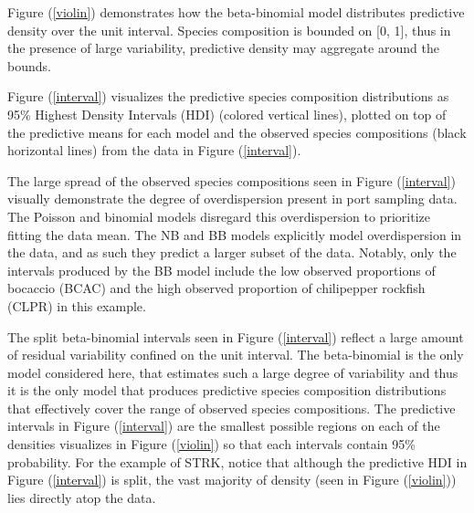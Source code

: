 \documentclass[12pt]{article}
\begin{document}
Figure (\ref{violin}) demonstrates how the beta-binomial model distributes 
predictive density over the unit interval. Species composition is bounded on 
{[}0, 1{]}, thus in the presence of large variability, predictive density may 
aggregate around the bounds.

Figure (\ref{interval}) visualizes the predictive species composition
distributions as 95\% Highest Density Intervals (HDI) (colored vertical
lines), plotted on top of the predictive means for each model and the
observed species compositions (black horizontal lines) from the data in
Figure (\ref{interval}).

The large spread of the observed species compositions seen in
Figure (\ref{interval}) visually demonstrate the degree of overdispersion
present in port sampling data. The Poisson and binomial models disregard
this overdispersion to prioritize fitting the data mean. The NB and BB
models explicitly model overdispersion in the data, and as such they
predict a larger subset of the data. Notably, only the intervals
produced by the BB model include the low observed proportions of
bocaccio (BCAC) and the high observed proportion of chilipepper rockfish
(CLPR) in this example.

The split beta-binomial intervals seen in Figure (\ref{interval}) reflect
a large amount of residual variability confined on the unit interval.
The beta-binomial is the only model considered here, that estimates such
a large degree of variability and thus it is the only model that
produces predictive species composition distributions that effectively
cover the range of observed species compositions. The predictive
intervals in Figure (\ref{interval}) are the smallest possible regions on
each of the densities visualizes in Figure (\ref{violin}) so that each
intervals contain 95\% probability. For the example of STRK, notice that
although the predictive HDI in Figure (\ref{interval}) is split, the vast
majority of density (seen in Figure (\ref{violin})) lies directly atop the
data.
\end{document}
